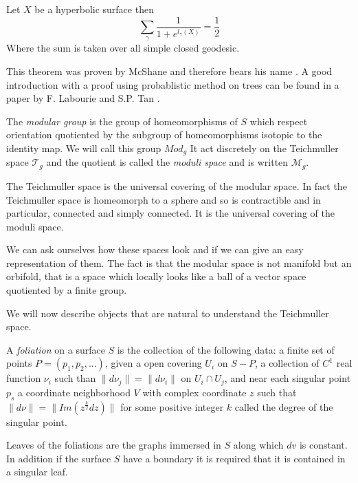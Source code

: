 \begin{thm}
Let $X$ be a hyperbolic surface then \[
\sum_{\gamma} \frac{1}{1+e^{l_{\gamma}(X)}}=\frac{1}{2}
\]
Where the sum is taken over all simple closed geodesic.
\end{thm}

This theorem was proven by McShane and therefore bears his name \cite{Mcshane95simplegeodesics}. A good introduction with a proof using probablistic method on trees can be found in a paper by F. Labourie and S.P. Tan \cite{labourie:hal-01654564}.

\begin{dfnt}
The \emph{modular group} is the group of homeomorphisms of $S$ which respect orientation quotiented by the subgroup of homeomorphisms isotopic to the identity map. We will call this group $Mod_g$
It act discretely on the Teichmuller space $\mathcal{T}_g$ and the quotient is called the \emph{moduli space} and is written $\mathcal{M}_g$.
\end{dfnt}

The Teichmuller space is the universal covering of the modular space. In fact the Teichmuller space is homeomorph to a sphere and so is contractible and in particular, connected and simply connected. It is the universal covering of the moduli space.

We can ask ourselves how these spaces look and if we can give an easy representation of them. The fact is that the modular space is not manifold but an orbifold, that is a space which locally looks like a ball of a vector space quotiented by a finite group.

We will now describe objects that are natural to understand the Teichmuller space.

\begin{dfnt}
A \emph{foliation} on a surface $S$ is the collection of the following data: a finite set of points $P=(p_1,p_2,...)$, given a open covering $U_i$ on $S-P$, a collection of $C^1$
 real function $\nu_i$ such than $\| d \nu_j \| = \| d \nu_i \|$  on $U_i \cap U_j$,
 and near each singular point $p_s$ a coordinate neighborhood $V$ with complex coordinate $z$ such that $\| d \nu \| = \| Im(z^{\frac{k}{2}}dz) \|$ for some positive integer $k$ called the degree of the singular point.

 Leaves of the foliations are the graphs immersed in $S$ along which $dv$ is constant. In addition if the surface $S$  have a boundary it is required that it is contained in a singular leaf.
\end{dfnt}

